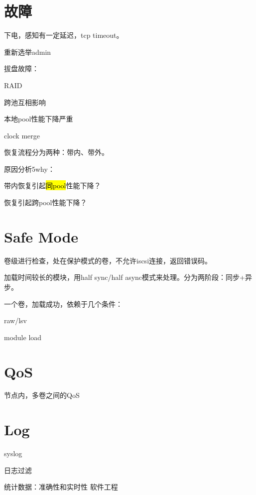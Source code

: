 \section{故障}

下电，感知有一定延迟，tcp timeout。

重新选举admin

拔盘故障：
\begin{enumbox}
\item RAID
\item 跨池互相影响
\item 本地pool性能下降严重
\item clock merge
\end{enumbox}

恢复流程分为两种：带内、带外。

原因分析5why：
\begin{enumbox}
\item 带内恢复引起\hl{同pool}性能下降？
\item 恢复引起跨pool性能下降？
\end{enumbox}

\section{Safe Mode}

卷级进行检查，处在保护模式的卷，不允许iscsi连接，返回错误码。

加载时间较长的模块，用half sync/half async模式来处理。分为两阶段：同步+异步。

一个卷，加载成功，依赖于几个条件：
\begin{compactitem}
\item raw/lsv
\item module load
\end{compactitem}

\section{QoS}

节点内，多卷之间的QoS

\section{Log}

syslog

日志过滤

统计数据：准确性和实时性
软件工程
